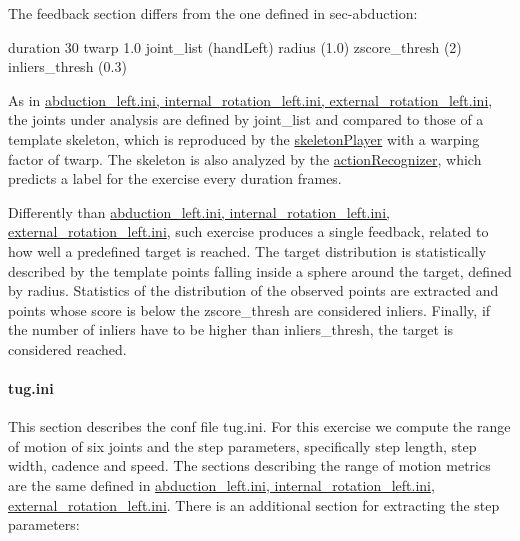 The feedback section differs from the one defined in sec-\/abduction\+:


\begin{DoxyCode}
[feedback]
duration                       30
twarp                          1.0
joint\_list                     (handLeft)
radius                         (1.0)
zscore\_thresh                  (2)
inliers\_thresh                 (0.3)
\end{DoxyCode}


As in \hyperlink{group__motionAnalyzer_sec-abduction}{abduction\+\_\+left.\+ini, internal\+\_\+rotation\+\_\+left.\+ini, external\+\_\+rotation\+\_\+left.\+ini}, the joints under analysis are defined by {\ttfamily joint\+\_\+list} and compared to those of a template skeleton, which is reproduced by the \hyperlink{group__skeletonPlayer}{skeleton\+Player} with a warping factor of {\ttfamily twarp}. The skeleton is also analyzed by the \hyperlink{group__actionRecognizer}{action\+Recognizer}, which predicts a label for the exercise every {\ttfamily duration} frames.

Differently than \hyperlink{group__motionAnalyzer_sec-abduction}{abduction\+\_\+left.\+ini, internal\+\_\+rotation\+\_\+left.\+ini, external\+\_\+rotation\+\_\+left.\+ini}, such exercise produces a single feedback, related to how well a predefined target is reached. The target distribution is statistically described by the template points falling inside a sphere around the {\ttfamily target}, defined by {\ttfamily radius}. Statistics of the distribution of the observed points are extracted and points whose score is below the {\ttfamily zscore\+\_\+thresh} are considered inliers. Finally, if the number of inliers have to be higher than {\ttfamily inliers\+\_\+thresh}, the target is considered reached.\hypertarget{group__motionAnalyzer_sec-tug}{}\paragraph{tug.\+ini}\label{group__motionAnalyzer_sec-tug}
This section describes the conf file tug.\+ini. For this exercise we compute the range of motion of six joints and the step parameters, specifically step length, step width, cadence and speed. The sections describing the range of motion metrics are the same defined in \hyperlink{group__motionAnalyzer_sec-abduction}{abduction\+\_\+left.\+ini, internal\+\_\+rotation\+\_\+left.\+ini, external\+\_\+rotation\+\_\+left.\+ini}. There is an additional section for extracting the step parameters\+:


